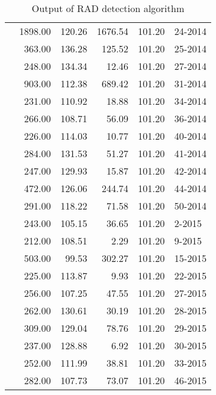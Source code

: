 \begin{table}[ht]
\begin{tabular}{rrrrrl}
 & 1898.00 & 120.26 & 1676.54 & 101.20 & 24-2014 \\ 
 & 363.00 & 136.28 & 125.52 & 101.20 & 25-2014 \\ 
 & 248.00 & 134.34 & 12.46 & 101.20 & 27-2014 \\ 
 & 903.00 & 112.38 & 689.42 & 101.20 & 31-2014 \\ 
 & 231.00 & 110.92 & 18.88 & 101.20 & 34-2014 \\ 
 & 266.00 & 108.71 & 56.09 & 101.20 & 36-2014 \\ 
 & 226.00 & 114.03 & 10.77 & 101.20 & 40-2014 \\ 
 & 284.00 & 131.53 & 51.27 & 101.20 & 41-2014 \\ 
 & 247.00 & 129.93 & 15.87 & 101.20 & 42-2014 \\ 
 & 472.00 & 126.06 & 244.74 & 101.20 & 44-2014 \\ 
 & 291.00 & 118.22 & 71.58 & 101.20 & 50-2014 \\ 
 & 243.00 & 105.15 & 36.65 & 101.20 & 2-2015 \\ 
 & 212.00 & 108.51 & 2.29 & 101.20 & 9-2015 \\ 
 & 503.00 & 99.53 & 302.27 & 101.20 & 15-2015 \\ 
 & 225.00 & 113.87 & 9.93 & 101.20 & 22-2015 \\ 
 & 256.00 & 107.25 & 47.55 & 101.20 & 27-2015 \\ 
 & 262.00 & 130.61 & 30.19 & 101.20 & 28-2015 \\ 
 & 309.00 & 129.04 & 78.76 & 101.20 & 29-2015 \\ 
 & 237.00 & 128.88 & 6.92 & 101.20 & 30-2015 \\ 
 & 252.00 & 111.99 & 38.81 & 101.20 & 33-2015 \\ 
 & 282.00 & 107.73 & 73.07 & 101.20 & 46-2015 \\ 
   \hline
\end{tabular}
\caption{Output of RAD detection algorithm}
\label{tab:RADTABLE}
\end{table}


